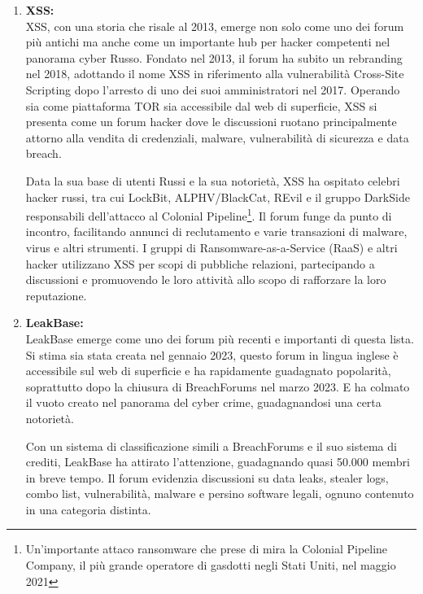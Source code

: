 \begin{enumerate}
    \item \textbf{XSS:}
    \\XSS, con una storia che risale al 2013, emerge non solo come uno dei forum più antichi ma anche come un importante hub per hacker competenti nel panorama cyber Russo. Fondato nel 2013, il forum ha subito un rebranding nel 2018, adottando il nome XSS in riferimento alla vulnerabilità Cross-Site Scripting dopo l'arresto di uno dei suoi amministratori nel 2017. Operando sia come piattaforma TOR sia accessibile dal web di superficie, XSS si presenta come un forum hacker dove le discussioni ruotano principalmente attorno alla vendita di credenziali, malware, vulnerabilità di sicurezza e data breach.

    Data la sua base di utenti Russi e la sua notorietà, XSS ha ospitato celebri hacker russi, tra cui LockBit, ALPHV/BlackCat, REvil e il gruppo DarkSide responsabili dell'attacco al Colonial Pipeline\footnote{Un'importante attaco ransomware che prese di mira la Colonial Pipeline Company, il più grande operatore di gasdotti negli Stati Uniti, nel maggio 2021}. Il forum funge da punto di incontro, facilitando annunci di reclutamento e varie transazioni di malware, virus e altri strumenti. I gruppi di Ransomware-as-a-Service (RaaS) e altri hacker utilizzano XSS per scopi di pubbliche relazioni, partecipando a discussioni e promuovendo le loro attività allo scopo di rafforzare la loro reputazione.
    

    
    \item \textbf{LeakBase:}
    \\LeakBase emerge come uno dei forum più recenti e importanti di questa lista. Si stima sia stata creata nel gennaio 2023, questo forum in lingua inglese è accessibile sul web di superficie e ha rapidamente guadagnato popolarità, soprattutto dopo la chiusura di BreachForums nel marzo 2023. E ha colmato il vuoto creato nel panorama del cyber crime, guadagnandosi una certa notorietà.

    Con un sistema di classificazione simili a BreachForums e il suo sistema di crediti, LeakBase ha attirato l'attenzione, guadagnando quasi 50.000 membri in breve tempo. Il forum evidenzia discussioni su data leaks, stealer logs, combo list, vulnerabilità, malware e persino software legali, ognuno contenuto in una categoria distinta.


\end{enumerate}
